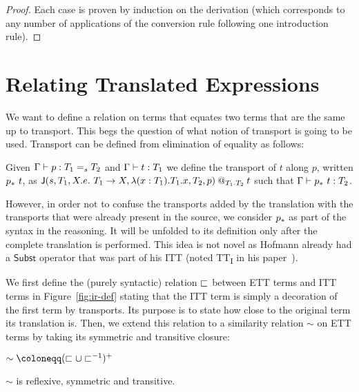 \begin{proof}
  Each case is proven by induction on the derivation
  (which corresponds to any number of applications of the conversion rule
  following one introduction rule).
\end{proof}

\section{Relating Translated Expressions}
\label{sec:relation}

We want to define a relation on terms that equates two terms that are
the same up to transport.
%
This begs the question of what notion of transport is going to be
used.
%
Transport can be defined from elimination of equality as follows:
%
\begin{definition}[Transport]
  Given $\isterm{\Ga}{p}{\Eq{s}{T_1}{T_2}}$ and
  $\isterm{\Ga}{t}{T_1}$ we define the transport of $t$ along $p$, written
  $\translpo{p}\ t$, as
  $\app
    {\J
      {s}
      {T_1}
      {X.e.\ T_1 \to X}
      {\lam{x:T_1}{T_1} x}
      {T_2}
      {p}
    }
    {T_1}
    {T_2}
    {t}
  $ such that $\isterm{\Ga}{\translpo{p}\ t}{T_2}$.
\end{definition}
%
However, in order not to confuse the transports added by the
translation with the transports that were already present in the
source, we consider $\translpo{p}$ as part of the syntax in the
reasoning. It will be unfolded to its definition only after the
complete translation is performed.
%
This idea is not novel as Hofmann already had a $\mathsf{Subst}$ operator that
was part of his ITT (noted TT\textsubscript{I} in his
paper~\cite{hofmann1995conservativity}).

%
We first define the (purely syntactic) relation $\ir$ between ETT terms
and ITT terms in Figure~\ref{fig:ir-def} stating that the ITT term is
simply a decoration of the first term by transports. Its purpose is to
state how close to the original term its translation is. Then, we extend
this relation to a similarity relation $\sim$ on ETT terms by taking its
symmetric and transitive closure:
\begin{center}$\sim \coloneqq (\ir \cup \ir^{-1})^+$
\end{center}

\begin{lemma}
  \label{lem:sim-er}
  $\sim$ is reflexive, symmetric and transitive.
\end{lemma}

